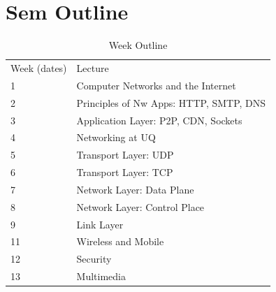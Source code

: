 \documentclass[12pt, a4paper]{article}
\begin{document}
	
		
	\tableofcontents
	
	\section{Sem Outline}
	\begin{table}[H]
		\begin{tabular}{ll}
			Week (dates) & Lecture\\
			1 & Computer Networks and the Internet\\
			2 & Principles of Nw Apps: HTTP, SMTP, DNS\\
			3 & Application Layer: P2P, CDN, Sockets\\
			4 & Networking at UQ\\
			5 & Transport Layer: UDP\\
			6 & Transport Layer: TCP\\
			7 & Network Layer: Data Plane\\
			8 & Network Layer: Control Place\\
			9 & Link Layer\\
			11 & Wireless and Mobile\\
			12 & Security\\
			13 & Multimedia
		\end{tabular}
		\centering
		\caption{Week Outline}
	\end{table}
\end{document}
